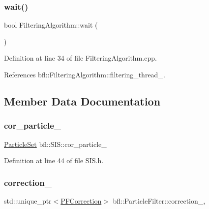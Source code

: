 \subsubsection{\texorpdfstring{wait()}{wait()}}
{\footnotesize\ttfamily bool Filtering\+Algorithm\+::wait (\begin{DoxyParamCaption}{ }\end{DoxyParamCaption})\hspace{0.3cm}{\ttfamily [inherited]}}



Definition at line 34 of file Filtering\+Algorithm.\+cpp.



References bfl\+::\+Filtering\+Algorithm\+::filtering\+\_\+thread\+\_\+.



\subsection{Member Data Documentation}
\mbox{\label{classbfl_1_1SIS_af35bb4dba4940cd7dcd292f7ac3644cc}} 
\subsubsection{\texorpdfstring{cor\+\_\+particle\+\_\+}{cor\_particle\_}}
{\footnotesize\ttfamily \mbox{\hyperlink{classbfl_1_1ParticleSet}{Particle\+Set}} bfl\+::\+S\+I\+S\+::cor\+\_\+particle\+\_\+\hspace{0.3cm}{\ttfamily [protected]}}



Definition at line 44 of file S\+I\+S.\+h.

\mbox{\label{classbfl_1_1ParticleFilter_a691428357c812ba009e995175778c173}} 
\subsubsection{\texorpdfstring{correction\+\_\+}{correction\_}}
{\footnotesize\ttfamily std\+::unique\+\_\+ptr$<$\mbox{\hyperlink{classbfl_1_1PFCorrection}{P\+F\+Correction}}$>$ bfl\+::\+Particle\+Filter\+::correction\+\_\+\hspace{0.3cm}{\ttfamily [protected]}, {\ttfamily [inherited]}}



